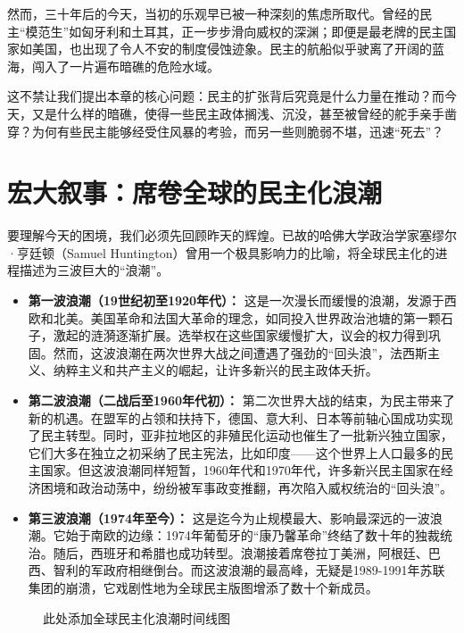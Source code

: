 \documentclass[a5paper, 11pt, openany]{ctexbook}
\newcommand{\imageplaceholder}[2][1.0\textwidth]{%
    \begin{figure}[htbp]
        \centering
        \fbox{\parbox[c][8cm][c]{#1}{\centering\vspace*{\fill}#2\vspace*{\fill}}}
        \caption{#2}
        \label{fig:#2}
    \end{figure}
}
\begin{document}
然而，三十年后的今天，当初的乐观早已被一种深刻的焦虑所取代。曾经的民主“模范生”如匈牙利和土耳其，正一步步滑向威权的深渊；即便是最老牌的民主国家如美国，也出现了令人不安的制度侵蚀迹象。民主的航船似乎驶离了开阔的蓝海，闯入了一片遍布暗礁的危险水域。

这不禁让我们提出本章的核心问题：民主的扩张背后究竟是什么力量在推动？而今天，又是什么样的暗礁，使得一些民主政体搁浅、沉没，甚至被曾经的舵手亲手凿穿？为何有些民主能够经受住风暴的考验，而另一些则脆弱不堪，迅速“死去”？

\section{宏大叙事：席卷全球的民主化浪潮}

要理解今天的困境，我们必须先回顾昨天的辉煌。已故的哈佛大学政治学家塞缪尔·亨廷顿（Samuel Huntington）曾用一个极具影响力的比喻，将全球民主化的进程描述为三波巨大的“浪潮”。

\begin{itemize}
    \item \textbf{第一波浪潮（19世纪初至1920年代）：} 这是一次漫长而缓慢的浪潮，发源于西欧和北美。美国革命和法国大革命的理念，如同投入世界政治池塘的第一颗石子，激起的涟漪逐渐扩展。选举权在这些国家缓慢扩大，议会的权力得到巩固。然而，这波浪潮在两次世界大战之间遭遇了强劲的“回头浪”，法西斯主义、纳粹主义和共产主义的崛起，让许多新兴的民主政体夭折。
    \item \textbf{第二波浪潮（二战后至1960年代初）：} 第二次世界大战的结束，为民主带来了新的机遇。在盟军的占领和扶持下，德国、意大利、日本等前轴心国成功实现了民主转型。同时，亚非拉地区的非殖民化运动也催生了一批新兴独立国家，它们大多在独立之初采纳了民主宪法，比如印度——这个世界上人口最多的民主国家。但这波浪潮同样短暂，1960年代和1970年代，许多新兴民主国家在经济困境和政治动荡中，纷纷被军事政变推翻，再次陷入威权统治的“回头浪”。
    \item \textbf{第三波浪潮（1974年至今）：} 这是迄今为止规模最大、影响最深远的一波浪潮。它始于南欧的边缘：1974年葡萄牙的“康乃馨革命”终结了数十年的独裁统治。随后，西班牙和希腊也成功转型。浪潮接着席卷拉丁美洲，阿根廷、巴西、智利的军政府相继倒台。而这波浪潮的最高峰，无疑是1989-1991年苏联集团的崩溃，它戏剧性地为全球民主版图增添了数十个新成员。
\end{itemize}

\imageplaceholder{此处添加全球民主化浪潮时间线图}
\end{document}

